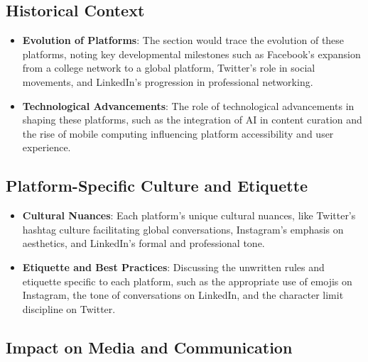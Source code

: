 \documentclass[
]{book}
\providecommand{\tightlist}{%
  \setlength{\itemsep}{0pt}\setlength{\parskip}{0pt}}
\begin{document}
\hypertarget{historical-context}{%
\subsection*{Historical Context}\label{historical-context}}

\begin{itemize}
\tightlist
\item
  \textbf{Evolution of Platforms}: The section would trace the evolution of these platforms, noting key developmental milestones such as Facebook's expansion from a college network to a global platform, Twitter's role in social movements, and LinkedIn's progression in professional networking.
\item
  \textbf{Technological Advancements}: The role of technological advancements in shaping these platforms, such as the integration of AI in content curation and the rise of mobile computing influencing platform accessibility and user experience.
\end{itemize}

\hypertarget{platform-specific-culture-and-etiquette}{%
\subsection*{Platform-Specific Culture and Etiquette}\label{platform-specific-culture-and-etiquette}}

\begin{itemize}
\tightlist
\item
  \textbf{Cultural Nuances}: Each platform's unique cultural nuances, like Twitter's hashtag culture facilitating global conversations, Instagram's emphasis on aesthetics, and LinkedIn's formal and professional tone.
\item
  \textbf{Etiquette and Best Practices}: Discussing the unwritten rules and etiquette specific to each platform, such as the appropriate use of emojis on Instagram, the tone of conversations on LinkedIn, and the character limit discipline on Twitter.
\end{itemize}

\hypertarget{impact-on-media-and-communication}{%
\subsection*{Impact on Media and Communication}\label{impact-on-media-and-communication}}
\end{document}
